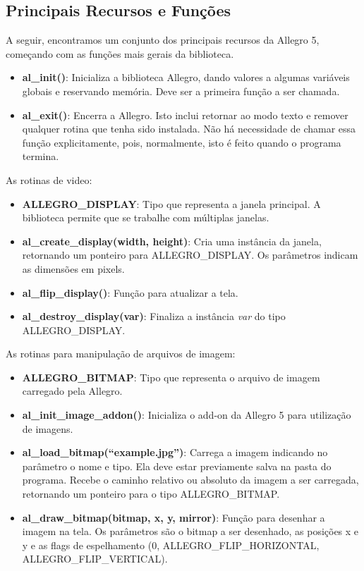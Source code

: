 \documentclass[a4paper,12pt]{report}
\begin{document}
\subsection{Principais Recursos e Funções}
%
A seguir, encontramos um conjunto dos principais recursos da Allegro 5, começando com
as funções mais gerais da biblioteca.
%
\begin{itemize}
 \item \textbf{al\_init()}: Inicializa a biblioteca Allegro, dando valores a algumas variáveis globais e reservando memória. 
 Deve ser a primeira função a ser chamada.
 \item \textbf{al\_exit()}: Encerra a Allegro. Isto inclui retornar ao modo texto e remover qualquer rotina que tenha sido instalada. 
 Não há necessidade de chamar essa função explicitamente, pois, normalmente, isto é feito quando o programa termina.
\end{itemize}
%
As rotinas de video:
%
\begin{itemize}
 \item \textbf{ALLEGRO\_DISPLAY}: Tipo que representa a janela principal. A biblioteca permite que se trabalhe com múltiplas janelas.
 \item \textbf{al\_create\_display(width, height)}: Cria uma instância da janela, retornando um ponteiro para ALLEGRO\_DISPLAY. 
 Os parâmetros indicam as dimensões em pixels.
 \item \textbf{al\_flip\_display()}: Função para atualizar a tela.
 \item \textbf{al\_destroy\_display(var)}: Finaliza a instância \textit{var} do tipo ALLEGRO\_DISPLAY\*.
\end{itemize}
%
As rotinas para manipulação de arquivos de imagem:
%
\begin{itemize}
 \item \textbf{ALLEGRO\_BITMAP}: Tipo que representa o arquivo de imagem carregado pela Allegro.
 \item \textbf{al\_init\_image\_addon()}: Inicializa o add-on da Allegro 5 para utilização de imagens.
 \item \textbf{al\_load\_bitmap(``example.jpg'')}: Carrega a imagem indicando no parâmetro o nome e tipo. Ela deve estar previamente salva na pasta 
 do programa. Recebe o caminho relativo ou absoluto da imagem a ser carregada, retornando um ponteiro para o tipo ALLEGRO\_BITMAP.
 \item \textbf{al\_draw\_bitmap(bitmap, x, y, mirror)}: Função para desenhar a imagem na tela. Os parâmetros são o bitmap a ser desenhado, as 
 posições x e y e as flags de espelhamento (0, ALLEGRO\_FLIP\_HORIZONTAL, ALLEGRO\_FLIP\_VERTICAL).
\end{itemize}
\end{document}

